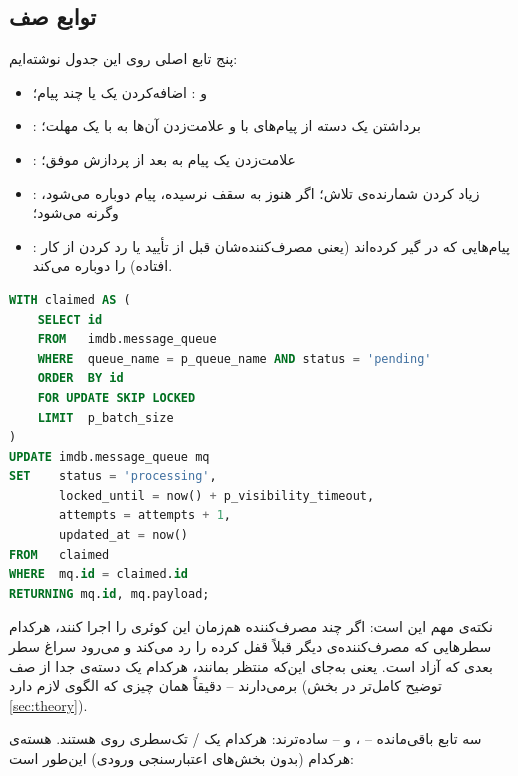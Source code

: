 \subsection{توابع  صف}

پنج تابع اصلی روی این جدول نوشته‌ایم:

\begin{itemize}
\item {} و : اضافه‌کردن یک یا چند پیام؛
\item {}: برداشتن یک دسته از پیام‌های  با  \cite{pglocking} و علامت‌زدن آن‌ها به  با یک مهلت؛
\item {}: علامت‌زدن یک پیام به  بعد از پردازش موفق؛
\item {}: زیاد کردن شمارنده‌ی تلاش؛ اگر هنوز به سقف نرسیده، پیام دوباره  می‌شود، وگرنه  می‌شود؛
\item {}: پیام‌هایی که در  گیر کرده‌اند (یعنی مصرف‌کننده‌شان قبل از تأیید یا رد کردن از کار افتاده) را دوباره  می‌کند.
\end{itemize}

\begin{latin}
\begin{lstlisting}[language=SQL, caption={Core of dequeue(): lock-free batch claim}]
WITH claimed AS (
    SELECT id
    FROM   imdb.message_queue
    WHERE  queue_name = p_queue_name AND status = 'pending'
    ORDER  BY id
    FOR UPDATE SKIP LOCKED
    LIMIT  p_batch_size
)
UPDATE imdb.message_queue mq
SET    status = 'processing',
       locked_until = now() + p_visibility_timeout,
       attempts = attempts + 1,
       updated_at = now()
FROM   claimed
WHERE  mq.id = claimed.id
RETURNING mq.id, mq.payload;
\end{lstlisting}
\end{latin}

نکته‌ی مهم  این است: اگر چند مصرف‌کننده هم‌زمان این کوئری را اجرا کنند، هرکدام سطرهایی که مصرف‌کننده‌ی دیگر قبلاً قفل کرده را رد می‌کند و می‌رود سراغ سطر بعدی که آزاد است. یعنی به‌جای این‌که منتظر بمانند، هرکدام یک دسته‌ی جدا از صف برمی‌دارند -- دقیقاً همان چیزی که الگوی  لازم دارد (توضیح کامل‌تر در بخش \ref{sec:theory}).

سه تابع باقی‌مانده -- ،  و  -- ساده‌ترند: هرکدام یک / تک‌سطری روی  هستند. هسته‌ی هرکدام (بدون بخش‌های اعتبارسنجی ورودی) این‌طور است:

